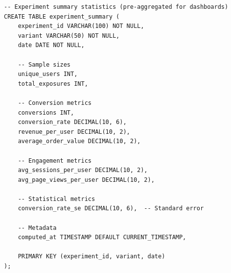\begin{lstlisting}
-- Experiment summary statistics (pre-aggregated for dashboards)
CREATE TABLE experiment_summary (
    experiment_id VARCHAR(100) NOT NULL,
    variant VARCHAR(50) NOT NULL,
    date DATE NOT NULL,

    -- Sample sizes
    unique_users INT,
    total_exposures INT,

    -- Conversion metrics
    conversions INT,
    conversion_rate DECIMAL(10, 6),
    revenue_per_user DECIMAL(10, 2),
    average_order_value DECIMAL(10, 2),

    -- Engagement metrics
    avg_sessions_per_user DECIMAL(10, 2),
    avg_page_views_per_user DECIMAL(10, 2),

    -- Statistical metrics
    conversion_rate_se DECIMAL(10, 6),  -- Standard error

    -- Metadata
    computed_at TIMESTAMP DEFAULT CURRENT_TIMESTAMP,

    PRIMARY KEY (experiment_id, variant, date)
);
\end{lstlisting}

